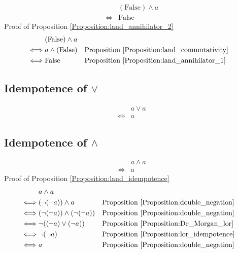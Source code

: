 \begin{prop}
\label{Proposition:land_annihilator_2}
\begin{align*}
& (\text{False}) \land a \\
\iff & \text{False}
\end{align*}
Proof of Proposition \ref{Proposition:land_annihilator_2}
\begin{align*}
& (\text{False}) \land a \\
\iff & a \land (\text{False})
& & \text{Proposition \ref{Proposition:land_commutativity}} \\
\iff & \text{False}
& & \text{Proposition \ref{Proposition:land_annihilator_1}} \\
\end{align*}
\end{prop}

\subsection{Idempotence of $\lor$}
\begin{prop}
\label{Proposition:lor_idempotence}
\begin{align*}
& a \lor a \\
\iff & a
\end{align*}
\end{prop}

\subsection{Idempotence of $\land$}
\begin{prop}
\label{Proposition:land_idempotence}
\begin{align*}
& a \land a \\
\iff & a
\end{align*}
Proof of Proposition \ref{Proposition:land_idempotence}
\begin{align*}
& a \land a \\
\iff & (\lnot (\lnot a)) \land a
& & \text{Proposition \ref{Proposition:double_negation}} \\
\iff & (\lnot (\lnot a)) \land (\lnot (\lnot a))
& & \text{Proposition \ref{Proposition:double_negation}} \\
\iff & \lnot ((\lnot a) \lor (\lnot a))
& & \text{Proposition \ref{Proposition:De_Morgan_lor}} \\
\iff & \lnot (\lnot a)
& & \text{Proposition \ref{Proposition:lor_idempotence}} \\
\iff & a
& & \text{Proposition \ref{Proposition:double_negation}} \\
\end{align*}
\end{prop}

